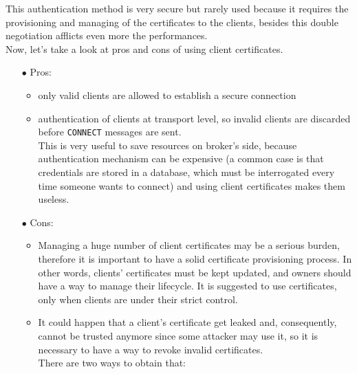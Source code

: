 \documentclass[12pt]{report}
\begin{document}
{{This authentication method is very secure but rarely used because it requires the provisioning and managing of the certificates to the clients, besides this double negotiation afflicts even more the performances.\\

Now, let's take a look at pros and cons of using client certificates.
\begin{itemize}
\setlength{\itemindent}{+4mm}
\item[$\bullet$] Pros:
\begin{itemize}
\item only valid clients are allowed to establish a secure connection
\item authentication of clients at transport level, so invalid clients are discarded before \texttt{CONNECT} messages are sent.\\ 
This is very useful to save resources on broker's side, because authentication mechanism can be expensive (a common case is that credentials are stored in a database, which must be interrogated every time someone wants to connect) and using client certificates makes them useless.
\end{itemize}

\item[$\bullet$] Cons:
\begin{itemize}
\item Managing a huge number of client certificates may be a serious burden, therefore it is important to have a solid certificate provisioning process. In other words, clients' certificates must be kept updated, and owners should have a way to manage their lifecycle.
It is suggested to use certificates, only when clients are under their strict control.
\item It could happen that a client's certificate get leaked and, consequently, cannot be trusted anymore since some attacker may use it, so it is necessary to have a way to revoke invalid certificates.\\
There are two ways to obtain that:


\end{itemize}
\end{itemize}}}
\end{document}
